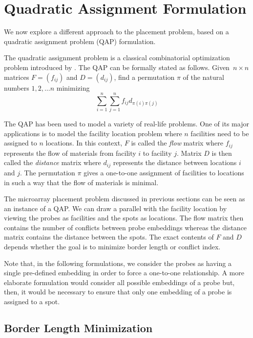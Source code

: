 \documentclass{bioinfo}
\begin{document}
\section{Quadratic Assignment Formulation}

We now explore a different approach to the placement problem, based on a quadratic assignment problem (QAP) formulation.

The quadratic assignment problem is a classical combinatorial optimization problem introduced by \citealp{KOOPMANS57}. The QAP can be formally stated as follows. Given~$n \times n$ matrices $F = (f_{ij})$ and $D = (d_{ij})$, find a permutation $\pi$ of the natural numbers $1, 2, \ldots n$ minimizing
\begin{equation}
\label{eq:qap_def}
\sum_{i=1}^{n} \sum_{j=1}^{n} f_{ij} d_{\pi(i)\pi(j)}
\end{equation}

The QAP has been used to model a variety of real-life problems. One of its major applications is to model the facility location problem where $n$ facilities need to be assigned to $n$ locations. In this context, $F$ is called the \emph{flow} matrix where $f_{ij}$ represents the flow of materials from facility $i$ to facility $j$. Matrix $D$ is then called the \emph{distance} matrix where $d_{ij}$ represents the distance between locations $i$ and $j$. The permutation $\pi$ gives a one-to-one assignment of facilities to locations in such a way that the flow of materials is minimal.

The microarray placement problem discussed in previous sections can be seen as an instance of a QAP. We can draw a parallel with the facility location by viewing the probes as facilities and the spots as locations. The flow matrix then contains the number of conflicts between probe embeddings whereas the distance matrix contains the distance between the spots. The exact contents of $F$ and $D$ depends whether the goal is to minimize border length or conflict index.

Note that, in the following formulations, we consider the probes as having a single pre-defined embedding in order to force a one-to-one relationship. A more elaborate formulation would consider all possible embeddings of a probe but, then, it would be necessary to ensure that only one embedding of a probe is assigned to a spot.

\subsection{Border Length Minimization}
\end{document}
